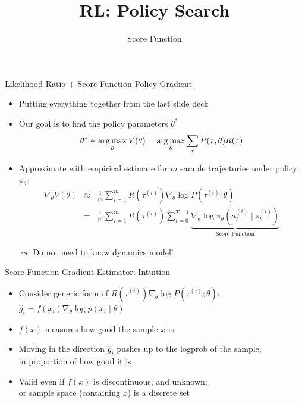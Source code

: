 \documentclass[aspectratio=169]{../latex_main/tntbeamer}  %
\title[RL: Score Function]{RL: Policy Search}
\subtitle{Score Function}
\begin{document}
	
	\maketitle

\begin{frame}[c]{Likelihood Ratio + Score Function Policy Gradient}
	
	\begin{itemize}
		\item Putting everything together from the last slide deck
		\item Our goal is to find the policy parameters $\theta^*$
		$$\theta^* \in \operatorname*{arg\,max}_{\theta} V(\theta) = \operatorname*{arg\,max}_{\theta}\sum_{\tau} P(\tau; \theta) R(\tau) $$
		\item Approximate with empirical estimate for $m$ sample trajectories under
		policy $\pi_\theta$:
		\begin{eqnarray}
		\nabla_\theta V(\theta) &\approx& \frac{1}{m} \sum_{i=1}^{m} R(\tau^{(i)}) \nabla_\theta \log P(\tau^{(i)}; \theta) \nonumber\\
		&=& \frac{1}{m} \sum_{i=1}^{m} R(\tau^{(i)}) \sum_{t=0}^{T-1} \underbrace{\nabla_\theta \log \pi_\theta (a_t^{(i)} \mid s_t^{(i)})}_{\text{Score Function}}
		\end{eqnarray}
		\item[$\leadsto$] Do not need to know dynamics model!
		
	\end{itemize}
	
\end{frame}
\begin{frame}[c]{Score Function Gradient Estimator: Intuition}
	
	\begin{itemize}
		\item Consider generic form of $R(\tau^{(i)}) \nabla_\theta \log P(\tau^{(i)}; \theta)$:\\
		$\hat{g}_i = f(x_i) \nabla_\theta \log p(x_i \mid \theta)$
		\item $f(x)$ measures how good the sample $x$ is
		\item Moving in the direction $\hat{g}_i$ pushes up to the logprob of the sample,\\ in proportion of how good it is
		\item Valid even if $f(x)$ is discontinuous; and unknown;\\ or sample space (containing $x$) is a discrete set
	\end{itemize}
	
\end{frame}
\end{document}

